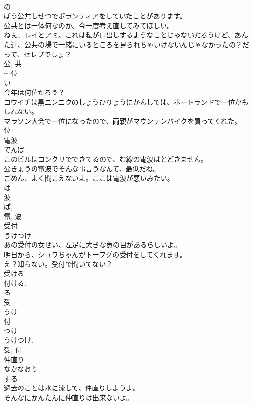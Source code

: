 \documentclass[8pt]{extreport}
\begin{document}
\begin{CJK}{UTF8}{min}
\\	の 
\\	ぼう公共しせつでボランティアをしていたことがあります。	
\\	公共とは一体何なのか、今一度考え直してみてほしい。	
\\	ねぇ、レイとアミ。これは私が口出しするようなことじゃないだろうけど、あんた達、公共の場で一緒にいるところを見られちゃいけないんじゃなかったの？だって、セレブでしょ？	
\\	公, 共	
\\	〜位	
\\	い	
\\	今年は何位だろう？	
\\	コウイチは黒ニンニクのしょうひりょうにかんしては、ポートランドで一位かもしれない。	
\\	マラソン大会で一位になったので、両親がマウンテンバイクを買ってくれた。	
\\	位	
\\	電波	
\\	でんぱ	
\\	このビルはコンクリでできてるので、む線の電波はとどきません。	
\\	公きょうの電波でそんな事言うなんて、最低だね。	
\\	ごめん、よく聞こえないよ。ここは電波が悪いみたい。	
\\	は 
\\	波 
\\	ぱ, 
\\	電, 波	
\\	受付	
\\	うけつけ	
\\	あの受付の女せい、左足に大きな魚の目があるらしいよ。	
\\	明日から、シュワちゃんがトーフグの受付をしてくれます。	
\\	え？知らない。受付で聞いてない？	
\\	受ける 
\\	付ける. 
\\	る
\\	受 
\\	うけ 
\\	付 
\\	つけ 
\\	うけつけ. 
\\	受, 付	
\\	仲直り	
\\	なかなおり	
\\	する 
\\	過去のことは水に流して、仲直りしようよ。	
\\	そんなにかんたんに仲直りは出来ないよ。	

\end{CJK}
\end{document}
